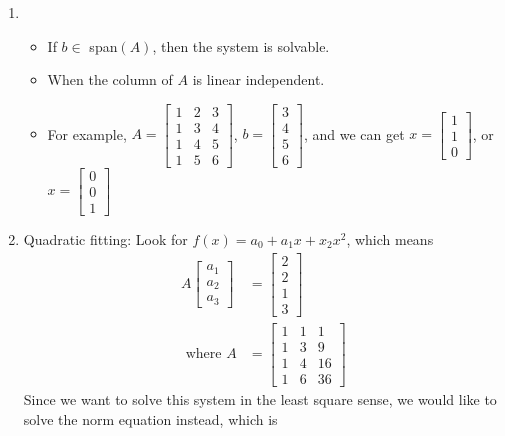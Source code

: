 \documentclass{article}
\begin{document}




\begin{enumerate}
\item
\begin{itemize}
\item
If $b \in $ span$(A)$, then the system is solvable.
\item
When the column of $A$ is linear independent.
\item
For example, $A = \begin{bmatrix}
1&2&3\\1&3&4\\1&4&5\\1&5&6
\end{bmatrix}$, $ b = \begin{bmatrix}
3\\4\\5\\6
\end{bmatrix}$, and we can get $x =\begin{bmatrix}
1\\1\\0
\end{bmatrix}$, or $x =\begin{bmatrix}
0\\0\\1
\end{bmatrix}$
\end{itemize}
\item
Quadratic fitting: Look for $f(x) = a_0+a_1x+x_2x^2$, which means \begin{align*}
A\begin{bmatrix}
a_1\\a_2\\a_3
\end{bmatrix}&=\begin{bmatrix}
2\\2\\1\\3
\end{bmatrix}\\
\mbox{ where }A &=\begin{bmatrix}
1&1&1\\1&3&9\\1&4&16\\1&6&36
\end{bmatrix}
\end{align*}
Since we want to solve this system in the least square sense, we would like to solve the norm equation instead, which is \begin{align*}

\end{align*}
\end{enumerate}
\end{document}
